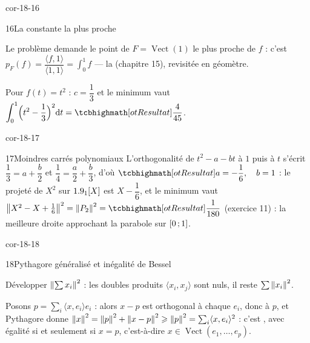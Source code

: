 \begin{blocLivre}{cor-18-16}
\begin{corrige}{16}{La constante la plus proche}
\begin{questions}
  \item Le problème demande le point de
    $F=\operatorname{Vect}(1)$ le plus proche de $f$ : c'est
    $p_F(f)=\dfrac{\langle f,1\rangle}{\langle1,1\rangle}
    =\displaystyle\int_0^1f$ — la 
    (chapitre 15), revisitée en géomètre.
  \item Pour $f(t)=t^{2}$ : $c=\dfrac13$ et le minimum vaut
    $\displaystyle\int_0^1\Bigl(t^{2}-\frac13\Bigr)^{2}\mathrm{d}t
    =\res{\dfrac{4}{45}}$.
\end{questions}
\end{corrige}
\end{blocLivre}

\begin{blocLivre}{cor-18-17}
\begin{corrige}{17}{Moindres carrés polynomiaux}
L'orthogonalité de $t^{2}-a-bt$ à $1$ puis à $t$ s'écrit
$\dfrac13=a+\dfrac b2$ et $\dfrac14=\dfrac a2+\dfrac b3$, d'où
$\res{a=-\dfrac16,\quad b=1}$ : le projeté de $X^{2}$ sur $1.9_1[X]$ est
$X-\dfrac16$, et le minimum vaut
$\norme{X^{2}-X+\tfrac16}^{2}=\norme{P_2}^{2}=\res{\dfrac{1}{180}}$
(exercice 11) : la meilleure droite approchant la parabole sur
$\mathopen{[}0\,{;}\,1\mathclose{]}$.
\end{corrige}
\end{blocLivre}

\begin{blocLivre}{cor-18-18}
\begin{corrige}{18}{Pythagore généralisé et inégalité de Bessel}
\begin{questions}
  \item Développer $\left\lVert\sum x_i\right\rVert^{2}$ : les doubles produits
    $\langle x_i,x_j\rangle$ sont nuls, il reste
    $\sum\left\lVert x_i\right\rVert^{2}$.
  \item Posons $p=\sum_i\langle x,e_i\rangle e_i$ : alors $x-p$ est
    orthogonal à chaque $e_i$, donc à $p$, et Pythagore donne
    $\left\lVert x\right\rVert^{2}=\left\lVert p\right\rVert^{2}+\left\lVert x-p\right\rVert^{2}
    \geqslant\left\lVert p\right\rVert^{2}=\sum_i\langle x,e_i\rangle^{2}$ : c'est
    , avec égalité si et seulement si $x=p$,
    c'est-à-dire $x\in\operatorname{Vect}(e_1,\dots,e_p)$.
\end{questions}
\end{corrige}
\end{blocLivre}

